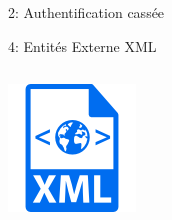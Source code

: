 \documentclass[final,hyperref={pdfpagelabels=false}]{beamer}
\begin{document}
\begin{frame}[t]
\begin{columns}[t]
\begin{column}{.465\textwidth}
\begin{block}{2: Authentification cassée}
	\end{block}

	\begin{block}{4: Entités Externe XML}
		\begin{columns}[T]

			\begin{column}{.12\textwidth} %
				\includegraphics[scale=1.35]{xml.png}
			\end{column}


\end{columns}
\end{block}
\end{column}
\end{columns}
\end{frame}
\end{document}

